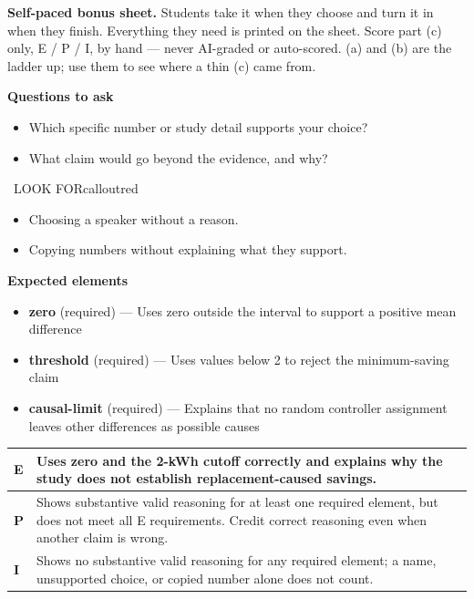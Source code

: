 \documentclass[11pt]{article}
\begin{document}
\textbf{Self-paced bonus sheet.} Students take it when they choose and turn it in when they finish. Everything they need is printed on the sheet. Score part (c) only, E / P / I, by hand --- never AI-graded or auto-scored. (a) and (b) are the ladder up; use them to see where a thin (c) came from.\par

\textbf{Questions to ask}
\begin{itemize}[leftmargin=1.5em,itemsep=2pt,topsep=2pt]
  \item Which specific number or study detail supports your choice?
  \item What claim would go beyond the evidence, and why?
\end{itemize}

\begin{callout}{\IconWarn\ LOOK FOR}{calloutred}
\begin{itemize}[leftmargin=1.5em,itemsep=2pt,topsep=2pt]
  \item Choosing a speaker without a reason.
  \item Copying numbers without explaining what they support.
\end{itemize}
\end{callout}


\textbf{Expected elements}
\begin{itemize}[leftmargin=1.5em,itemsep=2pt,topsep=2pt]
  \item \textbf{zero} (required) --- Uses zero outside the interval to support a positive mean difference
  \item \textbf{threshold} (required) --- Uses values below 2 to reject the minimum-saving claim
  \item \textbf{causal-limit} (required) --- Explains that no random controller assignment leaves other differences as possible causes
\end{itemize}

{\small\renewcommand{\arraystretch}{1.25}
\noindent\begin{tabular}{|p{0.5in}|p{5.9in}|}
\hline
\textbf{E} & Uses zero and the 2-kWh cutoff correctly and explains why the study does not establish replacement-caused savings. \\ \hline
\textbf{P} & Shows substantive valid reasoning for at least one required element, but does not meet all E requirements. Credit correct reasoning even when another claim is wrong. \\ \hline
\textbf{I} & Shows no substantive valid reasoning for any required element; a name, unsupported choice, or copied number alone does not count. \\ \hline
\end{tabular}}
\end{document}
